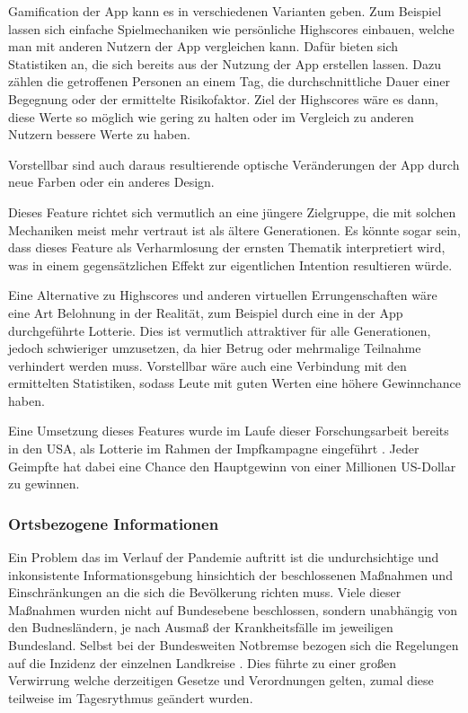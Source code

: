 \documentclass[conference,compsoc]{IEEEtran}
\begin{document}
Gamification der App kann es in verschiedenen Varianten geben. 
Zum Beispiel lassen sich einfache Spielmechaniken wie persönliche Highscores einbauen, welche man mit anderen Nutzern der App vergleichen kann. 
Dafür bieten sich Statistiken an, die sich bereits aus der Nutzung der App erstellen lassen. 
Dazu zählen die getroffenen Personen an einem Tag, die durchschnittliche Dauer einer Begegnung oder der ermittelte Risikofaktor. 
Ziel der Highscores wäre es dann, diese Werte so möglich wie gering zu halten oder im Vergleich zu anderen Nutzern bessere Werte zu haben.

Vorstellbar sind auch daraus resultierende optische Veränderungen der App durch neue Farben oder ein anderes Design.

Dieses Feature richtet sich vermutlich an eine jüngere Zielgruppe, die mit solchen Mechaniken meist mehr vertraut ist als ältere Generationen.
Es könnte sogar sein, dass dieses Feature als Verharmlosung der ernsten Thematik interpretiert wird, was in einem gegensätzlichen Effekt zur eigentlichen Intention resultieren würde.

Eine Alternative zu Highscores und anderen virtuellen Errungenschaften wäre eine Art Belohnung in der Realität, zum Beispiel durch eine in der App durchgeführte Lotterie.
Dies ist vermutlich attraktiver für alle Generationen, jedoch schwieriger umzusetzen, da hier Betrug oder mehrmalige Teilnahme verhindert werden muss. 
Vorstellbar wäre auch eine Verbindung mit den ermittelten Statistiken, sodass Leute mit guten Werten eine höhere Gewinnchance haben.

Eine Umsetzung dieses Features wurde im Laufe dieser Forschungsarbeit bereits in den USA, als Lotterie im Rahmen der Impfkampagne eingeführt \cite{Lotto}.
Jeder Geimpfte hat dabei eine Chance den Hauptgewinn von einer Millionen US-Dollar zu gewinnen.\\

\subsubsection{Ortsbezogene Informationen}
Ein Problem das im Verlauf der Pandemie auftritt ist die undurchsichtige und inkonsistente Informationsgebung 
hinsichtich der beschlossenen Maßnahmen und Einschränkungen an die sich die Bevölkerung richten muss. 
Viele dieser Maßnahmen wurden nicht auf Bundesebene beschlossen, sondern unabhängig von den Budnesländern, je nach Ausmaß der Krankheitsfälle im jeweiligen Bundesland.
Selbst bei der Bundesweiten Notbremse bezogen sich die Regelungen auf die Inzidenz der einzelnen Landkreise \cite{Notbremse}.
Dies führte zu einer großen Verwirrung welche derzeitigen Gesetze und Verordnungen gelten, zumal diese teilweise im Tagesrythmus geändert wurden.
\end{document}
